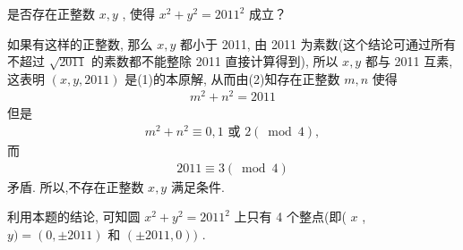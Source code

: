 \begin{example}
	是否存在正整数 $x ,  y$ , 使得 $x^{2}+y^{2}=2011^{2}$ 成立？
\end{example}
\begin{solution}
	如果有这样的正整数, 那么 $x ,  y$ 都小于 2011, 由 2011 为素数(这个结论可通过所有不超过 $\sqrt{2011}$ 的素数都不能整除 2011 直接计算得到), 所以 $x ,  y$ 都与 2011 互素, 这表明 $(x, y, 2011)$ 是(1)的本原解, 从而由(2)知存在正整数 $m ,  n$ 使得
	\begin{align*}
		m^{2}+n^{2}=2011
	\end{align*}
	但是
	\begin{align*}
		m^{2}+n^{2} \equiv 0 ,  1 \text { 或 } 2(\bmod 4),
	\end{align*}
	而
	\begin{align*}
		2011 \equiv 3(\bmod 4)
	\end{align*}
	矛盾. 所以,不存在正整数 $x ,  y$ 满足条件.
\end{solution}
\begin{note}
	利用本题的结论, 可知圆 $x^{2}+y^{2}=2011^{2}$ 上只有 4 个整点(即( $x$ ,  $y)=(0, \pm 2011)$ 和 $( \pm 2011,0))$ .
\end{note}
